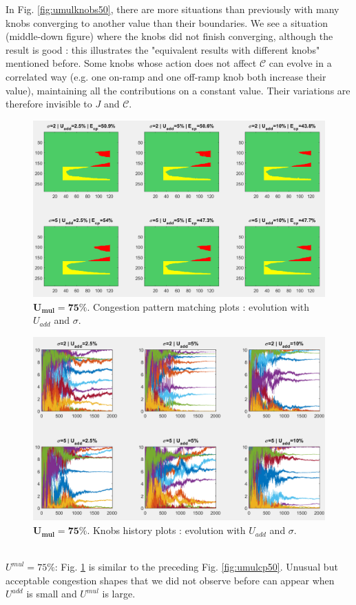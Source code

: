 In Fig. \ref{fig:umulknobs50}, there are more situations than previously with many knobs converging to another value than their  boundaries. We see a situation (middle-down figure) where the knobs did not finish converging, although the result is good : this illustrates the "equivalent results with different knobs" mentioned before. Some knobs whose action does not affect $\mathscr{C}$ can evolve in a correlated way (e.g. one on-ramp and one off-ramp knob both increase their value), maintaining all the contributions on a constant value. Their variations are therefore invisible to $J$ and $\mathscr{C}$.\\
\begin{figure}
	\label{fig:umulcp75}
	\caption{$\mathbf{U_{mul}=75\%}$. Congestion pattern matching plots : evolution with $U_{add}$ and $\sigma$.}
	\includegraphics[width=7in]{figures/results_figures/Umul/cp_Umul_75_lambda_11.png}
\end{figure}
\begin{figure}
	\label{fig:umulknobs75}
	\caption{$\mathbf{U_{mul}=75\%}$. Knobs history plots : evolution with $U_{add}$ and $\sigma$.}
	\includegraphics[width=7in]{figures/results_figures/Umul/knobs_Umul_75_lambda_11.png}
\end{figure}	
\\
\emph{$U^{mul}=75\% $}: Fig. \ref{fig:umulcp75} is similar to the preceding Fig. \ref{fig:umulcp50}. Unusual but acceptable congestion shapes that we did not observe before can appear when $U^{add}$ is small and $U^{mul}$  is large. 

